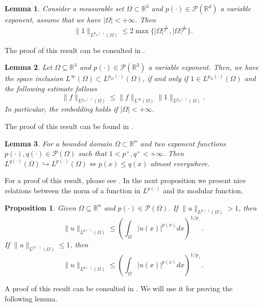 \documentclass[a4paper,12pt]{amsart}
\theoremstyle{definition}
\theoremstyle{plain}
\newtheorem{proposition}{Proposition}[section]
\newtheorem{lemma}{Lemma}[section]
\def\R{\mathbb{R}}
\def\R{\mathbb R}
\def\Rt{\mathbb{R}^d}
\begin{document}
\begin{lemma}\label{PropositionLpplusminus}
Consider a measurable set $\Omega\subset \R^3$ and $p(\cdot)\in \mathcal{P}(\Rt)$ a variable exponent, assume that we have $|\Omega|<+\infty$.  Then 
$$\|1\|_{L^{p_{\Omega}(\cdot) }(\Omega)}\leq 2\max\{|\Omega|^{\frac 1{ p^-}},|\Omega|^{\frac 1{p^+}}\}.$$
\end{lemma}
The proof of this result can be consulted in \cite[Lemma 3.2.12]{Diening_Libro}.  
\begin{lemma}\label{lemmaLinftyLpvariable}
Let $\Omega\subseteq \R^3$ and $p(\cdot)\in \mathcal{P}(\mathbb{R}^3)$ a variable exponent. Then, we have the space inclusion $L^{\infty} (\Omega) \subset L^{p_{\Omega}(\cdot)} (\Omega)$, if and only if $1\in  L^{p_{\Omega}(\cdot)} (\Omega) $ and  the following estimate follows
$$\|f\|_{L^{p_{\Omega}(\cdot)} (\Omega)}\leq \|f\|_{L^\infty(\Omega)}\|1\|_{L^{p_{\Omega}(\cdot)} (\Omega)}.$$
In particular, the embedding holds if $|\Omega|<+\infty$.
\end{lemma}
The proof of this result can be found in \cite[Proposition 2.43]{CRUZ}. 
\begin{lemma}\label{lemma2.3}
For a bounded domain $\Omega\subset\mathbb{R}^{n}$ and two exponent functions $p(\cdot), q(\cdot)\in \mathcal{P}(\Omega)$ such that $1<p^{+}, q^{+}<+\infty$. Then  $L^{q(\cdot)}(\Omega)\hookrightarrow L^{p (\cdot)}(\Omega)\iff p (x)\leq q(x)$ almost everywhere. 
\end{lemma}
For a proof of this result, please see \cite[Corollary 2.48]{CRUZ}. 
In the next proposition we present nice relations between the norm of a function in $L^{p(\cdot)}$ and its modular function.
%
\begin{proposition} \label{proposition.utendzero}
 Given $\Omega \subseteq \R^n$ and $p(\cdot) \in \mathcal{P}(\Omega)$. If $\|u\|_{L^{p(\cdot)}(\Omega)} > 1$, then
\[
 \|u\|_{L^{p(\cdot)}(\Omega)} \leq \left(\int_{\Omega} |u(x)|^{p(x)}dx \right)^{1/p_-}.
\]
If $\|u\|_{L^{p(\cdot)}(\Omega)} \leq 1$, then
\[
 \|u\|_{L^{p(\cdot)}(\Omega)} \leq \left(\int_{\Omega} |u(x)|^{p(x)}dx \right)^{1/p_+}.
\] 
\end{proposition}
%
\noindent A proof of this result can be consulted in \cite[Chapter 2, page 25]{CRUZ}. We will use it for proving the following lemma.
 
\end{document}
